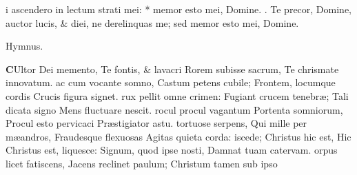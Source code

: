 \documentclass[letter,11pt]{book}
\makeatletter
\DeclareRobustCommand{\Vbar}{\vers@resp{-0.1em}{V}}
\newcommand{\vers@resp@sym}{\raisebox{0.2ex}{\rotatebox[origin=c]{-20}{$\m@th\rceil$}}}
\newcommand{\vers@resp}[2]{%
  {\ooalign{\hidewidth\kern#1\vers@resp@sym\hidewidth\cr#2\cr}}%
}%
\def\V{\color{Red} \Vbar . \color{black}}
\makeatother
\begin{document}
\begin{multicols*}{2}
i ascendero in lectum strati mei: * memor esto mei, Domine.
\newline \V Te precor, Domine, auctor lucis, \& diei, ne derelinquas me; sed memor esto mei, Domine.
\vspace{-.5em} \begin{center} \color{Red} Hymnus. \end{center} \vspace{-.5em}
\lettrine[lines=2]{\bfseries \color{Red} C}{}Ultor Dei memento,
\newline Te fontis, \& lavacri
\newline \indent Rorem subisse sacrum,
\newline \indent Te chrismate innovatum.
ac cum vocante somno,
\newline \indent Castum petens cubile;
\newline \indent Frontem, locumque cordis
\newline \indent Crucis figura signet.
rux pellit omne crimen:
\newline \indent Fugiant crucem tenebr\ae ;
\newline \indent Tali dicata signo
\newline \indent Mens fluctuare nescit.
rocul procul vagantum
\newline \indent Portenta somniorum,
\newline \indent Procul esto pervicaci
\newline \indent Pr\ae stigiator astu.
 tortuose serpens,
\newline \indent Qui mille per m\ae andros,
\newline \indent Fraudesque flexuosas
\newline \indent Agitas quieta corda:
iscede; Christus hic est,
\newline \indent Hic Christus est, liquesce:
\newline \indent Signum, quod ipse nosti,
\newline \indent Damnat tuam catervam.
orpus licet fatiscens,
\newline \indent Jacens reclinet paulum;
\newline \indent Christum tamen sub ipso

\end{multicols*}
\end{document}
